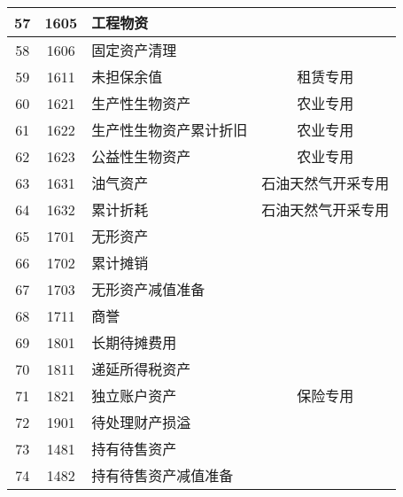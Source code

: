 \documentclass[a4paper]{ctexart}    %
\begin{document}
\begin{center}
\begin{longtable}{|c|c|p{6cm}|c|}
57 & 1605 & 工程物资 & \\\hline
58 & 1606 & 固定资产清理 & \\\hline
59 & 1611 & 未担保余值 & 租赁专用 \\\hline
60 & 1621 & 生产性生物资产 & 农业专用 \\\hline
61 & 1622 & 生产性生物资产累计折旧 & 农业专用 \\\hline
62 & 1623 & 公益性生物资产 & 农业专用 \\\hline
63 & 1631 & 油气资产 & 石油天然气开采专用 \\\hline
64 & 1632 & 累计折耗 & 石油天然气开采专用 \\\hline
65 & 1701 & 无形资产 & \\\hline
66 & 1702 & 累计摊销 & \\\hline
67 & 1703 & 无形资产减值准备 & \\\hline
68 & 1711 & 商誉 & \\\hline
69 & 1801 & 长期待摊费用 & \\\hline
70 & 1811 & 递延所得税资产 & \\\hline
71 & 1821 & 独立账户资产 & 保险专用 \\\hline
72 & 1901 & 待处理财产损溢 & \\\hline
73 & 1481 & 持有待售资产 & \\\hline
74 & 1482 & 持有待售资产减值准备 & \\\hline\hline \hline
\end{longtable}
\end{center}
\end{document}
